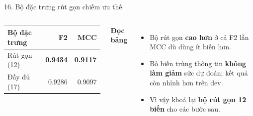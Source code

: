 \documentclass[t, aspectratio=169, 11pt]{beamer}
\newcommand{\blk}[1]{\textbf{\color{hustprimary}#1}}
\begin{document}
\begin{frame}{16. Bộ đặc trưng rút gọn chiếm ưu thế}
    \begin{columns}[T]
        \begin{table}
            \centering\small
            \renewcommand{\arraystretch}{1.2}
            \begin{tabular}{lrr}
            \toprule
            \textbf{Bộ đặc trưng} & \textbf{F2} & \textbf{MCC}\\
            \midrule
            Rút gọn (12) & \textbf{0.9434} & \textbf{0.9117}\\
            Đầy đủ (17)  & 0.9286 & 0.9097\\
            \bottomrule
            \end{tabular}
        \end{table}

        \blk{Đọc bảng}
        \begin{itemize}
            \item Bộ rút gọn \textbf{cao hơn} ở cả F2 lẫn MCC dù dùng ít biến hơn.
            \item Bỏ biến trùng thông tin \textbf{không làm giảm} sức dự đoán; kết quả còn nhỉnh hơn trên dev.
            \item Vì vậy khoá lại \textbf{bộ rút gọn 12 biến} cho các bước sau.
        \end{itemize}
    \end{columns}
\end{frame}
\end{document}
